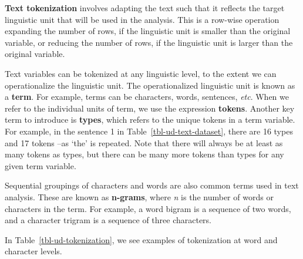 \documentclass[
  letterpaper,
]{latex/krantz}
\theoremstyle{definition}
\theoremstyle{remark}
\begin{document}
\textbf{Text tokenization} involves adapting the text such that it
reflects the target linguistic unit that will be used in the analysis.
This is a row-wise operation expanding the number of rows, if the
linguistic unit is smaller than the original variable, or reducing the
number of rows, if the linguistic unit is larger than the original
variable.

Text variables can be tokenized at any linguistic level, to the extent
we can operationalize the linguistic unit. The operationalized
linguistic unit is known as a \textbf{term}. For example, terms can be
characters, words, sentences, \emph{etc}. When we refer to the
individual units of term, we use the expression \textbf{tokens}. Another
key term to introduce is \textbf{types}, which refers to the unique
tokens in a term variable. For example, in the sentence 1 in
Table~\ref{tbl-ud-text-dataset}, there are 16 types and 17 tokens --as
`the' is repeated. Note that there will always be at least as many
tokens as types, but there can be many more tokens than types for any
given term variable.

Sequential groupings of characters and words are also common terms used
in text analysis. These are known as \textbf{n-grams}, where \emph{n} is
the number of words or characters in the term. For example, a word
bigram is a sequence of two words, and a character trigram is a sequence
of three characters.

In Table~\ref{tbl-ud-tokenization}, we see examples of tokenization at
word and character levels.
\end{document}
